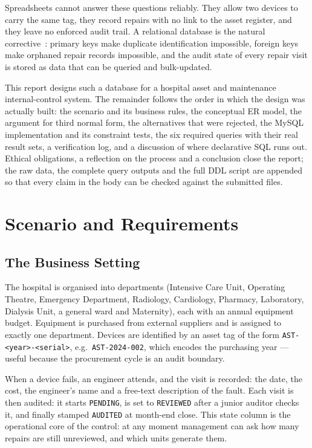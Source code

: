 \documentclass[conference]{IEEEtran}
\begin{document}
Spreadsheets cannot answer these questions reliably. They allow two devices
to carry the same tag, they record repairs with no link to the asset
register, and they leave no enforced audit trail. A relational database is
the natural corrective~\cite{codd}: primary keys make duplicate identification
impossible, foreign keys make orphaned repair records impossible, and the
audit state of every repair visit is stored as data that can be queried and
bulk-updated.

This report designs such a database for a hospital asset and maintenance
internal-control system. The remainder follows the order in which the
design was actually built: the scenario and its business rules, the
conceptual ER model, the argument for third normal form, the alternatives
that were rejected, the MySQL implementation and its constraint tests, the
six required queries with their real result sets, a verification log, and a
discussion of where declarative SQL runs out. Ethical obligations, a
reflection on the process and a conclusion close the report; the raw data,
the complete query outputs and the full DDL script are appended so that
every claim in the body can be checked against the submitted files.

\section{Scenario and Requirements}
\subsection{The Business Setting}
The hospital is organised into departments (Intensive Care Unit, Operating
Theatre, Emergency Department, Radiology, Cardiology, Pharmacy, Laboratory,
Dialysis Unit, a general ward and Maternity), each with an annual equipment
budget. Equipment is purchased from external suppliers and is assigned to
exactly one department. Devices are identified by an asset tag of the form
\texttt{AST-<year>-<serial>}, e.g.\ \texttt{AST-2024-002}, which encodes the
purchasing year --- useful because the procurement cycle is an audit
boundary.

When a device fails, an engineer attends, and the visit is recorded: the
date, the cost, the engineer's name and a free-text description of the fault.
Each visit is then audited: it starts \texttt{PENDING}, is set to
\texttt{REVIEWED} after a junior auditor checks it, and finally stamped
\texttt{AUDITED} at month-end close. This state column is the operational
core of the control: at any moment management can ask how many repairs are
still unreviewed, and which units generate them.
\end{document}
